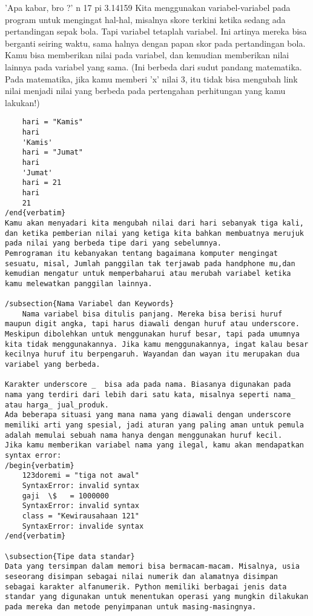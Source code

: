 'Apa kabar, bro ?' 
	n 
	17 
	pi  
	3.14159 
Kita menggunakan variabel-variabel pada program untuk mengingat hal-hal, misalnya skore terkini ketika sedang ada pertandingan sepak bola. Tapi variabel tetaplah variabel. Ini artinya mereka bisa berganti seiring waktu, sama halnya dengan papan skor pada pertandingan bola. Kamu bisa memberikan nilai pada variabel, dan kemudian memberikan nilai lainnya pada variabel yang sama. (Ini berbeda dari sudut pandang matematika. Pada matematika, jika kamu memberi 'x' nilai 3, itu tidak bisa mengubah link nilai menjadi nilai yang berbeda pada pertengahan perhitungan yang kamu lakukan!) 
\begin{verbatim}
	hari = "Kamis" 
	hari 
	'Kamis'
	hari = "Jumat" 
	hari 
	'Jumat' 
	hari = 21
	hari 
	21 
/end{verbatim}
Kamu akan menyadari kita mengubah nilai dari hari sebanyak tiga kali, dan ketika pemberian nilai yang ketiga kita bahkan membuatnya merujuk pada nilai yang berbeda tipe dari yang sebelumnya. 
Pemrograman itu kebanyakan tentang bagaimana komputer mengingat sesuatu, misal, Jumlah panggilan tak terjawab pada handphone mu,dan kemudian mengatur untuk memperbaharui atau merubah variabel ketika kamu melewatkan panggilan lainnya. 

/subsection{Nama Variabel dan Keywords}
	Nama variabel bisa ditulis panjang. Mereka bisa berisi huruf maupun digit angka, tapi harus diawali dengan huruf atau underscore. Meskipun dibolehkan untuk menggunakan huruf besar, tapi pada umumnya kita tidak menggunakannya. Jika kamu menggunakannya, ingat kalau besar kecilnya huruf itu berpengaruh. Wayandan dan wayan itu merupakan dua variabel yang berbeda.

Karakter underscore _  bisa ada pada nama. Biasanya digunakan pada nama yang terdiri dari lebih dari satu kata, misalnya seperti nama_ atau harga_ jual_produk.
Ada beberapa situasi yang mana nama yang diawali dengan underscore memiliki arti yang spesial, jadi aturan yang paling aman untuk pemula adalah memulai sebuah nama hanya dengan menggunakan huruf kecil.
Jika kamu memberikan variabel nama yang ilegal, kamu akan mendapatkan syntax error: 
/begin{verbatim}
	123doremi = "tiga not awal" 
	SyntaxError: invalid syntax 
	gaji  \$   = 1000000 
	SyntaxError: invalid syntax 
	class = "Kewirausahaan 121" 
	SyntaxError: invalide syntax 
/end{verbatim}

\subsection{Tipe data standar}
Data yang tersimpan dalam memori bisa bermacam-macam. Misalnya, usia seseorang disimpan sebagai nilai numerik dan alamatnya disimpan sebagai karakter alfanumerik. Python memiliki berbagai jenis data standar yang digunakan untuk menentukan operasi yang mungkin dilakukan pada mereka dan metode penyimpanan untuk masing-masingnya.


\end{verbatim}

